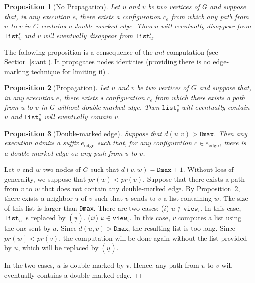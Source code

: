 \documentclass[11pt,english]{article}
\newtheorem{proposition}{Proposition}
\newenvironment{proof}[1][0cm]{
  \begin{list}{\bf Proof.~}{
      \setlength{\itemindent}{0cm}
      \setlength{\labelsep}{0cm}
      \setlength{\labelwidth}{#1}
      \setlength{\leftmargin}{#1}
    \item
    }
}{\hfill$\Box$
  \end{list}
}
\begin{document}
\begin{proposition}[No Propagation]\label{p:nopropagation}
  Let $u$ and $v$ be two vertices of $G$ and suppose that, in any execution $e$,
  there exists a configuration $c_e$ from which any path from $u$ to $v$ in $G$
  contains a double-marked edge. Then $u$ will eventually disappear from
  $\texttt{list}_v^{c}$ and $v$ will eventually disappear from $\texttt{list}_u^{c}$.
\end{proposition}

The following proposition is a consequence of the \emph{ant} computation (see
Section~\ref{s:ant}). It propagates nodes identities (providing there is no
edge-marking technique for limiting it) \cite{DT03,JACIC06}.

\begin{proposition}[Propagation]\label{p:propagation}
  Let $u$ and $v$ be two vertices of $G$ and suppose that, in any execution $e$,
  there exists a configuration $c_e$ from which there exists a path from $u$ to $v$
  in $G$ without double-marked edge. Then $\texttt{list}_v^{c}$ will eventually
  contain $u$ and $\texttt{list}_u^{c}$ will eventually contain $v$.
\end{proposition}


\begin{proposition}[Double-marked edge]\label{p:dme}
  Suppose that $d(u,v) > \texttt{Dmax}$. Then any execution admits a suffix
  $e_\texttt{edge}$ such that, for any configuration $c \in e_\texttt{edge}$,
  there is a double-marked edge on any path from $u$ to $v$.
\end{proposition}

\begin{proof}
  Let $v$ and $w$ two nodes of $G$ such that $d(v,w) = \texttt{Dmax} + 1$. Without loss
  of generality, we suppose that $pr(w) < pr(v)$. Suppose that there exists a
  path from $v$ to $w$ that does not contain any double-marked edge. By
  Proposition~\ref{p:propagation}, there exists a neighbor $u$ of $v$ such that
  $u$ sends to $v$ a list containing $w$. The size of this list is larger than
  \texttt{Dmax}. There are two cases:
\newline \noindent 
  ($i$) $u \not\in \texttt{view}_v$. In this case, $\texttt{list}_u$ is
    replaced by $(\underline{\underline{u}})$.
\newline \noindent 
  ($ii$) $u \in \texttt{view}_v$. In this case, $v$ computes a list using the
  one sent by $u$. Since $d(u,v) > \texttt{Dmax}$, the resulting list is too
  long. Since $pr(w) < pr(v)$, the computation will be done again without the
  list provided by $u$, which will be replaced by
  $(\underline{\underline{u}})$.

  In the two cases, $u$ is double-marked by $v$. Hence, any path from $u$ to $v$
  will eventually contains a double-marked edge.
\end{proof}
\end{document}
